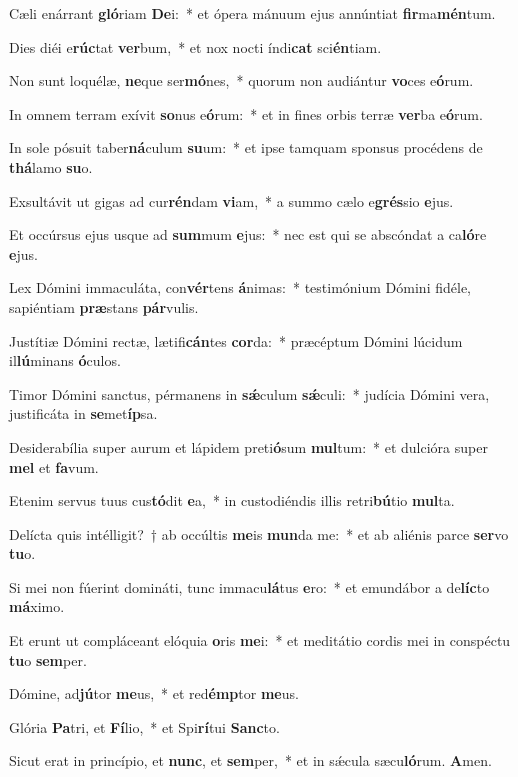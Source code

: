 \item Cæli enárrant \textbf{gló}riam \textbf{De}i:~* et ópera mánuum ejus annúntiat \textbf{fir}ma\textbf{mén}tum.
\item Dies diéi e\textbf{rúc}tat \textbf{ver}bum,~* et nox nocti índi\textbf{cat} sci\textbf{én}tiam.
\item Non sunt loquélæ, \textbf{ne}que ser\textbf{mó}nes,~* quorum non audiántur \textbf{vo}ces e\textbf{ó}rum.
\item In omnem terram exívit \textbf{so}nus e\textbf{ó}rum:~* et in fines orbis terræ \textbf{ver}ba e\textbf{ó}rum.
\item In sole pósuit taber\textbf{ná}culum \textbf{su}um:~* et ipse tamquam sponsus procédens de \textbf{thá}lamo \textbf{su}o.
\item Exsultávit ut gigas ad cur\textbf{rén}dam \textbf{vi}am,~* a summo cælo e\textbf{grés}sio \textbf{e}jus.
\item Et occúrsus ejus usque ad \textbf{sum}mum \textbf{e}jus:~* nec est qui se abscóndat a ca\textbf{ló}re \textbf{e}jus.
\item Lex Dómini immaculáta, con\textbf{vér}tens \textbf{á}nimas:~* testimónium Dómini fidéle, sapiéntiam \textbf{præ}stans \textbf{pár}vulis.
\item Justítiæ Dómini rectæ, lætifi\textbf{cán}tes \textbf{cor}da:~* præcéptum Dómini lúcidum il\textbf{lú}minans \textbf{ó}culos.
\item Timor Dómini sanctus, pérmanens in \textbf{sǽ}culum \textbf{sǽ}culi:~* judícia Dómini vera, justificáta in \textbf{se}met\textbf{íp}sa.
\item Desiderabília super aurum et lápidem preti\textbf{ó}sum \textbf{mul}tum:~* et dulcióra super \textbf{mel} et \textbf{fa}vum.
\item Etenim servus tuus cus\textbf{tó}dit \textbf{e}a,~* in custodiéndis illis retri\textbf{bú}tio \textbf{mul}ta.
\item Delícta quis intélligit?~† ab occúltis \textbf{me}is \textbf{mun}da me:~* et ab aliénis parce \textbf{ser}vo \textbf{tu}o.
\item Si mei non fúerint domináti, tunc immacu\textbf{lá}tus \textbf{e}ro:~* et emundábor a de\textbf{líc}to \textbf{má}ximo.
\item Et erunt ut compláceant elóquia \textbf{o}ris \textbf{me}i:~* et meditátio cordis mei in conspéctu \textbf{tu}o \textbf{sem}per.
\item Dómine, ad\textbf{jú}tor \textbf{me}us,~* et red\textbf{émp}tor \textbf{me}us.
\item Glória \textbf{Pa}tri, et \textbf{Fí}lio,~* et Spi\textbf{rí}tui \textbf{Sanc}to.
\item Sicut erat in princípio, et \textbf{nunc}, et \textbf{sem}per,~* et in sǽcula sæcu\textbf{ló}rum. \textbf{A}men.
